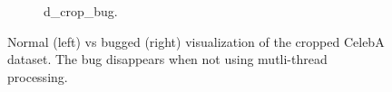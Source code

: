 \begin{figure}[!htbp]
\begin{subfigure}[t]{0.48\textwidth}
   \caption{d_crop_bug.}
   \label{fig:2019-05-06_celeba-bug-d}
\end{subfigure}
   \caption{Normal (left) vs bugged (right) visualization of the cropped CelebA dataset. The bug disappears when not using mutli-thread processing.}
   \label{fig:2019-05-06_celeba-bug}
\end{figure}